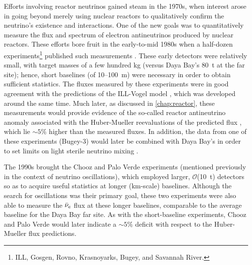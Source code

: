 \documentclass[../thesis.tex]{subfiles}
\begin{document}
Efforts involving reactor neutrinos gained steam in the 1970s, when interest arose in going beyond merely using nuclear reactors to qualitatively confirm the neutrino's existence and interactions. One of the new goals was to quantitatively measure the flux and spectrum of electron antineutrinos produced by nuclear reactors. These efforts bore fruit in the early-to-mid 1980s when a half-dozen experiments\footnote{ILL, Gosgen, Rovno, Krasnoyarks, Bugey, and Savannah River.} published such measurements \cite{PhysRevD.24.1097,Zacek:1986cu,Afonin:1985rw,Aleshin_2008,Abbes:1995nc,Sobel:1982gf}. These early detectors were relatively small, with target masses of a few hundred kg (versus Daya Bay's 80~t at the far site); hence, short baselines (of 10--100~m) were necessary in order to obtain sufficient statistics. The fluxes measured by these experiments were in good agreement with the predictions of the ILL-Vogel model \cite{SCHRECKENBACH1985325,VONFEILITZSCH1982162,HAHN1989365,PhysRevC.24.1543}, which was developed around the same time. Much later, as discussed in \autoref{chap:reactor}, these measurements would provide evidence of the so-called reactor antineutrino anomaly \cite{PhysRevD.83.073006} associated with the Huber-Mueller reevaluations of the predicted flux \cite{PhysRevC.84.024617,PhysRevC.83.054615}, which lie $\sim5$\% higher than the measured fluxes. In addition, the data from one of these experiments (Bugey-3) would later be combined with Daya Bay's in order to set limits on light sterile neutrino mixing \cite{PhysRevLett.117.151801}.

The 1990s brought the Chooz \cite{Apollonio_2003} and Palo Verde \cite{PhysRevD.64.112001} experiments (mentioned previously in the context of neutrino oscillations), which employed larger, $\mathcal{O}$(10~t) detectors so as to acquire useful statistics at longer (km-scale) baselines. Although the search for oscillations was their primary goal, these two experiments were also able to measure the $\bar\nu_e$ flux at these longer baselines, comparable to the average baseline for the Daya Bay far site. 
As with the short-baseline experiments, Chooz and Palo Verde would later indicate a $\sim5$\% deficit with respect to the Huber-Mueller flux predictions.
\end{document}
